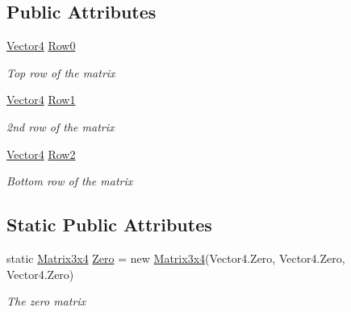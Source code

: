 \subsection*{Public Attributes}
\begin{DoxyCompactItemize}
\item 
\hyperlink{struct_open_t_k_1_1_vector4}{Vector4} \hyperlink{struct_open_t_k_1_1_matrix3x4_ae04dec2e88ddc0d5a848cf4273a3e452}{Row0}
\begin{DoxyCompactList}\small\item\em Top row of the matrix \end{DoxyCompactList}\item 
\hyperlink{struct_open_t_k_1_1_vector4}{Vector4} \hyperlink{struct_open_t_k_1_1_matrix3x4_a1389c564fa76be3c934f6eda4604e76a}{Row1}
\begin{DoxyCompactList}\small\item\em 2nd row of the matrix \end{DoxyCompactList}\item 
\hyperlink{struct_open_t_k_1_1_vector4}{Vector4} \hyperlink{struct_open_t_k_1_1_matrix3x4_a1ca39713a5c98f912081b57f23f3b90c}{Row2}
\begin{DoxyCompactList}\small\item\em Bottom row of the matrix \end{DoxyCompactList}\end{DoxyCompactItemize}
\subsection*{Static Public Attributes}
\begin{DoxyCompactItemize}
\item 
static \hyperlink{struct_open_t_k_1_1_matrix3x4}{Matrix3x4} \hyperlink{struct_open_t_k_1_1_matrix3x4_a3d510f6ca496df802ced6cf0bd612888}{Zero} = new \hyperlink{struct_open_t_k_1_1_matrix3x4}{Matrix3x4}(Vector4.\-Zero, Vector4.\-Zero, Vector4.\-Zero)
\begin{DoxyCompactList}\small\item\em The zero matrix \end{DoxyCompactList}\end{DoxyCompactItemize}
